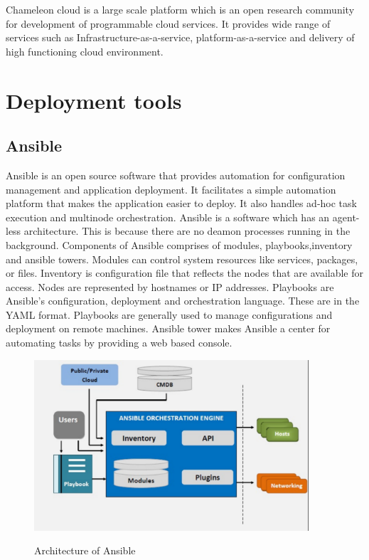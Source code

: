 \documentclass[9pt,twocolumn,twoside]{../../styles/osajnl}
\begin{document}
Chameleon cloud is a large scale platform which is an open research
community for development of programmable cloud services. It provides
wide range of services such as Infrastructure-as-a-service,
platform-as-a-service and delivery of high functioning cloud
environment.

\section{Deployment tools}

\subsection{Ansible}

Ansible is an open source software that provides automation for
configuration management and application deployment. It facilitates a
simple automation platform that makes the application easier to
deploy. It also handles ad-hoc task execution and multinode
orchestration. Ansible is a software which has an agent-less
architecture. This is because there are no deamon processes running in
the background.  Components of Ansible comprises of modules,
playbooks,inventory and ansible towers.  Modules can control system
resources like services, packages, or files. Inventory is
configuration file that reflects the nodes that are available for
access. Nodes are represented by hostnames or IP addresses. Playbooks
are Ansible's configuration, deployment and orchestration
language. These are in the YAML format. Playbooks are generally used
to manage configurations and deployment on remote machines. Ansible
tower makes Ansible a center for automating tasks by providing a web
based console\cite{ansible-tutorial}.

\begin{figure}[ht]
  \includegraphics[width= \linewidth, height =
    2.5in]{images/ansible_architecture.pdf}
  \caption{Architecture of Ansible}\cite{ansible-architecture}
\end{figure}
\end{document}
